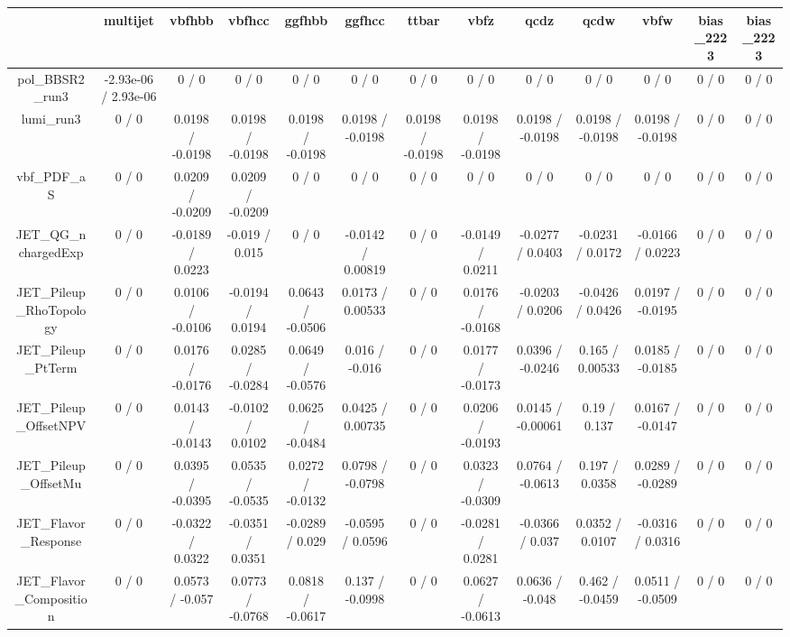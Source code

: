 \documentclass[10pt]{article}
\begin{document}
\begin{table}[htbp]
\begin{center}
\begin{tabular}{|c|c|c|c|c|c|c|c|c|c|c|c|c|}
\hline 
      & multijet      & vbfhbb      & vbfhcc      & ggfhbb      & ggfhcc      & ttbar      & vbfz      & qcdz      & qcdw      & vbfw      & bias_2223      & bias_2223 \\ 
\hline 
  pol_BBSR2_run3 & -2.93e-06 / 2.93e-06 & 0 / 0 & 0 / 0 & 0 / 0 & 0 / 0 & 0 / 0 & 0 / 0 & 0 / 0 & 0 / 0 & 0 / 0 & 0 / 0 & 0 / 0 \\ 
  lumi_run3 & 0 / 0 & 0.0198 / -0.0198 & 0.0198 / -0.0198 & 0.0198 / -0.0198 & 0.0198 / -0.0198 & 0.0198 / -0.0198 & 0.0198 / -0.0198 & 0.0198 / -0.0198 & 0.0198 / -0.0198 & 0.0198 / -0.0198 & 0 / 0 & 0 / 0 \\ 
  vbf_PDF_aS & 0 / 0 & 0.0209 / -0.0209 & 0.0209 / -0.0209 & 0 / 0 & 0 / 0 & 0 / 0 & 0 / 0 & 0 / 0 & 0 / 0 & 0 / 0 & 0 / 0 & 0 / 0 \\ 
  JET_QG_nchargedExp & 0 / 0 & -0.0189 / 0.0223 & -0.019 / 0.015 & 0 / 0 & -0.0142 / 0.00819 & 0 / 0 & -0.0149 / 0.0211 & -0.0277 / 0.0403 & -0.0231 / 0.0172 & -0.0166 / 0.0223 & 0 / 0 & 0 / 0 \\ 
  JET_Pileup_RhoTopology & 0 / 0 & 0.0106 / -0.0106 & -0.0194 / 0.0194 & 0.0643 / -0.0506 & 0.0173 / 0.00533 & 0 / 0 & 0.0176 / -0.0168 & -0.0203 / 0.0206 & -0.0426 / 0.0426 & 0.0197 / -0.0195 & 0 / 0 & 0 / 0 \\ 
  JET_Pileup_PtTerm & 0 / 0 & 0.0176 / -0.0176 & 0.0285 / -0.0284 & 0.0649 / -0.0576 & 0.016 / -0.016 & 0 / 0 & 0.0177 / -0.0173 & 0.0396 / -0.0246 & 0.165 / 0.00533 & 0.0185 / -0.0185 & 0 / 0 & 0 / 0 \\ 
  JET_Pileup_OffsetNPV & 0 / 0 & 0.0143 / -0.0143 & -0.0102 / 0.0102 & 0.0625 / -0.0484 & 0.0425 / 0.00735 & 0 / 0 & 0.0206 / -0.0193 & 0.0145 / -0.00061 & 0.19 / 0.137 & 0.0167 / -0.0147 & 0 / 0 & 0 / 0 \\ 
  JET_Pileup_OffsetMu & 0 / 0 & 0.0395 / -0.0395 & 0.0535 / -0.0535 & 0.0272 / -0.0132 & 0.0798 / -0.0798 & 0 / 0 & 0.0323 / -0.0309 & 0.0764 / -0.0613 & 0.197 / 0.0358 & 0.0289 / -0.0289 & 0 / 0 & 0 / 0 \\ 
  JET_Flavor_Response & 0 / 0 & -0.0322 / 0.0322 & -0.0351 / 0.0351 & -0.0289 / 0.029 & -0.0595 / 0.0596 & 0 / 0 & -0.0281 / 0.0281 & -0.0366 / 0.037 & 0.0352 / 0.0107 & -0.0316 / 0.0316 & 0 / 0 & 0 / 0 \\ 
  JET_Flavor_Composition & 0 / 0 & 0.0573 / -0.057 & 0.0773 / -0.0768 & 0.0818 / -0.0617 & 0.137 / -0.0998 & 0 / 0 & 0.0627 / -0.0613 & 0.0636 / -0.048 & 0.462 / -0.0459 & 0.0511 / -0.0509 & 0 / 0 & 0 / 0 \\ 

\end{tabular}
\end{center}
\end{table}
\end{document}

